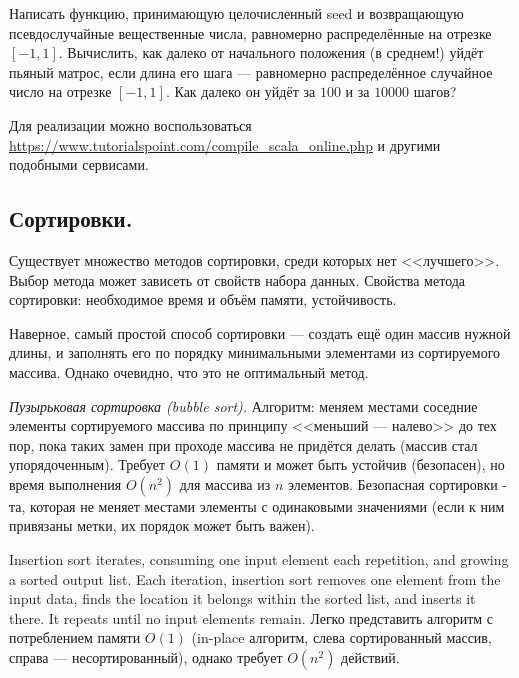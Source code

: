 \documentclass{book}
\begin{document}
Написать функцию, принимающую целочисленный seed и возвращающую псевдослучайные вещественные числа,
равномерно распределённые на отрезке $[-1,1]$. Вычислить, как далеко от начального положения (в
среднем!) уйдёт пьяный матрос, если длина его шага --- равномерно распределённое случайное число на
отрезке $[-1,1]$. Как далеко он уйдёт за $100$ и за $10000$ шагов?

Для реализации можно воспользоваться \url{https://www.tutorialspoint.com/compile_scala_online.php}
и другими подобными сервисами.

\subsection{Сортировки.}

Существует множество методов сортировки, среди которых нет <<лучшего>>. Выбор
метода может зависеть от свойств набора данных. Свойства метода сортировки:
необходимое время и объём памяти, устойчивость.

Наверное, самый простой способ сортировки --- создать ещё один массив нужной длины, и заполнять его
по порядку минимальными элементами из сортируемого массива. Однако очевидно, что это не оптимальный
метод.
 
\textit{Пузырьковая сортировка (bubble sort).} Алгоритм: меняем местами соседние элементы
сортируемого массива по принципу <<меньший --- налево>> до тех пор, пока таких
замен при проходе массива не придётся делать (массив стал упорядоченным).
Требует $O(1)$ памяти и может быть устойчив (безопасен), но время выполнения
$O(n^2)$ для массива из $n$ элементов. Безопасная сортировки - та, которая не меняет местами
элементы с одинаковыми значениями (если к ним привязаны метки, их порядок может быть важен).

Insertion sort iterates, consuming one input element each repetition, and growing a sorted output
list. Each iteration, insertion sort removes one element from the input data, finds the location
it belongs within the sorted list, and inserts it there. It repeats until no input elements
remain. Легко представить алгоритм с потреблением памяти $O(1)$ (in-place алгоритм, слева
сортированный массив, справа --- несортированный), однако требует $O(n^2)$ действий.
\end{document}
